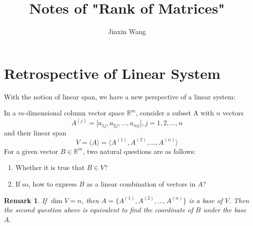 \documentclass[onecolumn]{ctexart}
\title{Notes of "Rank of Matrices"}
\author{Jinxin Wang}
\date{}
\newtheorem{remark}{Remark}
\begin{document}
\maketitle

\section{Retrospective of Linear System}

With the notion of linear span, we have a new perspective of a linear system:

In a $m$-dimensional column vector space $\mathbb{R}^m$, consider a subset A with $n$ vectors
\[
  A^{(j)} = \lbrack a_{1j}, a_{2j}, \ldots, a_{mj} \rbrack , j = 1, 2, \ldots, n
\]
and their linear span
\[
  V = \langle A \rangle = \langle A^{(1)}, A^{(2)}, \ldots, A^{(n)} \rangle
\]
For a given vector $B \in \mathbb{R}^m$, two natural questions are as follows:
\begin{enumerate}
  \item Whether it is true that $B \in V$?
  \item If so, how to express $B$ as a linear combination of vectors in $A$?
\end{enumerate}
\begin{remark}
  If $\dim V = n$, then $A = \lbrace A^{(1)}, A^{(2)}, \ldots, A^{(n)} \rbrace$ 
  is a base of $V$. Then the second question above is equivalent to find the 
  coordinate of $B$ under the base $A$.
\end{remark}
\end{document}
